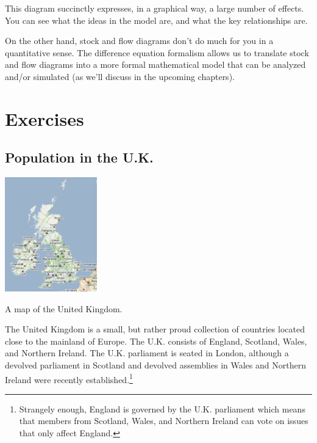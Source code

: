 This diagram succinctly expresses, in a graphical way, a large number of effects.  You can see what the ideas in the model are, and what the key relationships are.

On the other hand, stock and flow diagrams don't do much for you in a quantitative sense.  The difference equation formalism allows us to translate stock and flow diagrams into a more formal mathematical model that can be analyzed and/or simulated (as we'll discuss in the upcoming chapters).  

\clearpage

\section{Exercises}

\subsection{Population in the U.K.}
\begin{marginfigure}
\includegraphics[width=4cm]{figs/ukmap}
\caption{A map of the United Kingdom.}
\end{marginfigure}

 The United Kingdom is a small, but rather proud collection of countries located close to the mainland of Europe. The U.K. consists of England, Scotland, Wales, and Northern Ireland. The U.K. parliament is seated in London, although a devolved parliament in Scotland and devolved assemblies in Wales and Northern Ireland were recently established.\footnote{Strangely enough, England is governed by the U.K. parliament which means that members from Scotland, Wales, and Northern Ireland can vote on issues that only affect England.}



